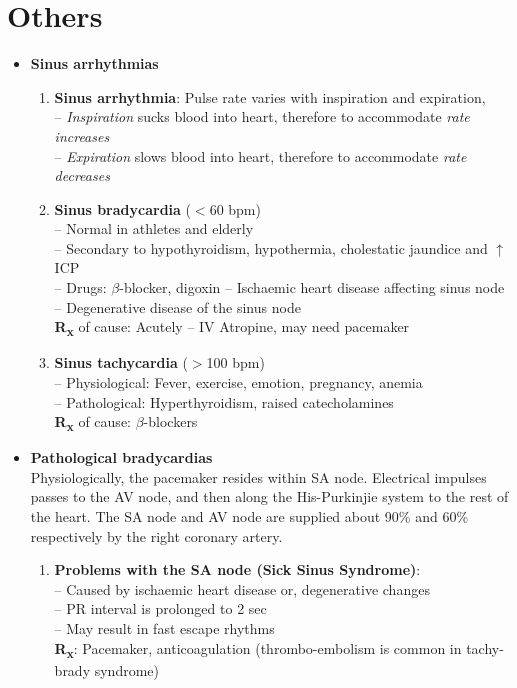 \documentclass[11pt,a4paper]{report}
\begin{document}
\section{Others}
\begin{itemize}
	\item \textbf{Sinus arrhythmias}
	\begin{enumerate}
		\item \textbf{Sinus arrhythmia}: Pulse rate varies with inspiration and expiration, \\
		-- \textit{Inspiration} sucks blood into heart, therefore to accommodate \textit{rate increases} \\
		-- \textit{Expiration} slows blood into heart, therefore to accommodate \textit{rate decreases} 
		\item \textbf{Sinus bradycardia} ($<$60 bpm)\\
		-- Normal in athletes and elderly \\
		-- Secondary to hypothyroidism, hypothermia, cholestatic jaundice and $\uparrow$ ICP \\
		-- Drugs: $\beta$-blocker, digoxin
		-- Ischaemic heart disease affecting sinus node \\
		-- Degenerative disease of the sinus node \\
		\textbf{R\textsubscript{x}} of cause: Acutely -- IV Atropine, may need pacemaker  
		\item \textbf{Sinus tachycardia} ($>$100 bpm) \\
		-- Physiological: Fever, exercise, emotion, pregnancy, anemia \\
		-- Pathological: Hyperthyroidism, raised catecholamines \\
		\textbf{R\textsubscript{x}} of cause: $\beta$-blockers
	\end{enumerate}
	\item \textbf{Pathological bradycardias} \\
	Physiologically, the pacemaker resides within SA node. Electrical impulses passes to the AV node, and then along the His-Purkinjie system to the rest of the heart. The SA node and AV node are supplied about 90\% and 60\% respectively by the right coronary artery. 
	\begin{enumerate}
		\item \textbf{Problems with the SA node (Sick Sinus Syndrome)}:\\
		-- Caused by ischaemic heart disease or, degenerative changes \\
		-- PR interval is prolonged to 2 sec \\
		-- May result in fast escape rhythms \\
		\textbf{R\textsubscript{x}}: Pacemaker, anticoagulation (thrombo-embolism is common in tachy-brady syndrome)
		

\end{enumerate}
\end{itemize}
\end{document}
